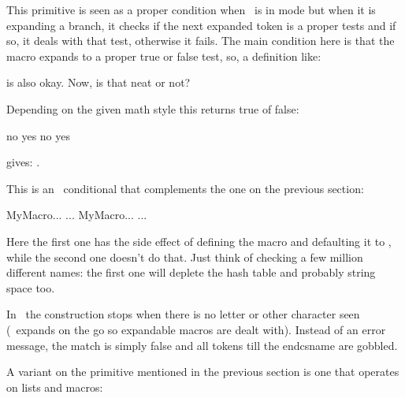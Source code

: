 This primitive is seen as a proper condition when \TEX\ is in  mode but when it is expanding a branch, it checks if
the next expanded token is a proper tests and if so, it deals with that test,
otherwise it fails. The main condition here is that the \type {\MyTest} macro
expands to a proper true or false test, so, a definition like:

\starttyping
\def\MyTest{\ifnum\scratchcounter<10 }
\stoptyping

is also okay. Now, is that neat or not?

\stopnewprimitive

\startnewprimitive[title={\prm {ifcramped}}]

Depending on the given math style this returns true of false:

\startbuffer
\ifcramped\mathstyle        no  \fi
\ifcramped\crampedtextstyle yes \fi
\ifcramped\textstyle        no  \fi
\ifcramped\displaystyle     yes \fi
\stopbuffer

\typebuffer

gives: \inlinebuffer.

\stopnewprimitive

\startoldprimitive[title={\prm {ifcsname}}]

This is an \ETEX\ conditional that complements the one on the previous section:

\starttyping
\expandafter\ifx\csname MyMacro\endcsname\relax ... \else ... \fi
            \ifcsname   MyMacro\endcsname       ... \else ... \fi
\stoptyping

Here the first one has the side effect of defining the macro and defaulting it to
, while the second one doesn't do that. Just think of checking a
few million different names: the first one will deplete the hash table and
probably string space too.

In \LUAMETATEX\ the construction stops when there is no letter or other character
seen (\TEX\ expands on the go so expandable macros are dealt with). Instead of an
error message, the match is simply false and all tokens till the \prm
{endcsname} are gobbled.

\stopoldprimitive

\startnewprimitive[title={\prm {ifcstok}}]

A variant on the primitive mentioned in the previous section is one that
operates on lists and macros:

\startbuffer[a]
 \def\b{b} \def\c{a}
\stopbuffer

